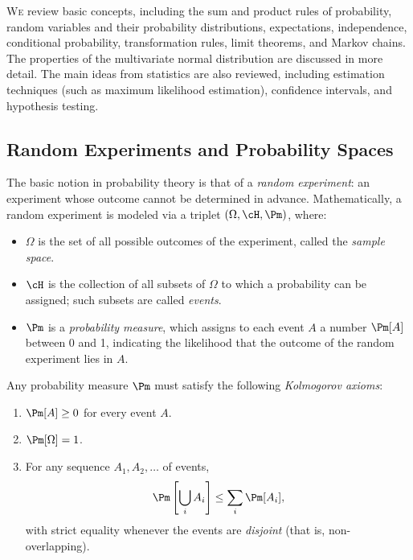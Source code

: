 \lettrine[lines=2, lhang=0.1]{W}{e} review basic concepts, including the sum and product rules of probability, random variables and their probability distributions, expectations, independence, conditional probability, transformation rules, limit theorems, and Markov chains. The properties of the multivariate normal distribution are discussed in more detail. The main ideas from statistics are also reviewed, including estimation techniques (such as maximum likelihood estimation), confidence intervals, and hypothesis testing.

\subsection{Random Experiments and Probability Spaces}
The basic notion in probability theory is that of a \textit{random experiment}: an experiment whose outcome cannot be determined in advance. Mathematically, a random experiment is modeled via a triplet $(\Omega, \cH, \Pm)$, where:
\begin{itemize}
	\item $\Omega$ is the set of all possible outcomes of the experiment, called the \textit{sample space}.
	\item $\cH$ is the collection of all subsets of $\Omega$ to which a probability can be assigned; such subsets are called \textit{events}.
	\item $\Pm$ is a \textit{probability measure}, which assigns to each event $A$ a number $\Pm[A]$ between 0 and 1, indicating the likelihood that the outcome of the random experiment lies in $A$.
\end{itemize}
Any probability measure $\Pm$ must satisfy the following \textit{Kolmogorov axioms}:
\begin{enumerate}
	\item $\Pm[A] \ge 0$ for every event $A$.
	\item $\Pm[\Omega] = 1$.
	\item For any sequence $A_1, A_2, \dots$ of events,
	      \begin{equation}
		      \Pm\left[ \bigcup_i A_i \right] \le \sum_i \Pm[A_i], \label{eq:SubAdditivity}
	      \end{equation}
	      with strict equality whenever the events are \textit{disjoint} (that is, non-overlapping).
\end{enumerate}

